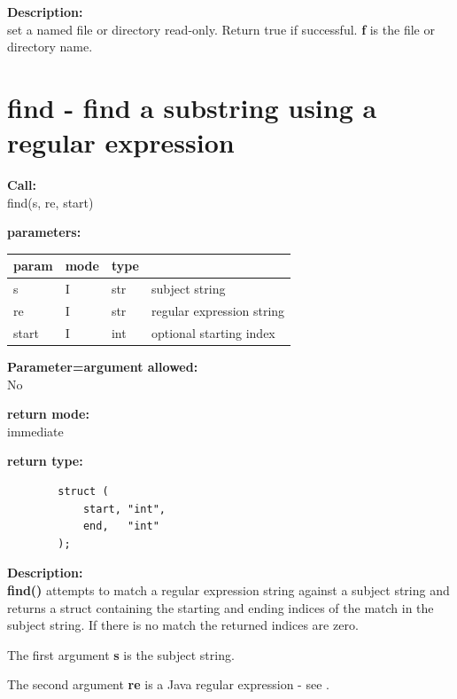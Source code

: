         {\bf Description:} \\
        set a named file or directory read-only. Return true if successful.
        {\bf f} is the file or directory name.




       

    \section{find - find a substring using a regular expression}\label{sec:iffind}
        
        {\bf Call:} \\
        find(s, re, start)
        
        {\bf parameters:} \\
        \begin{tabular}{| l | l | l | l |}
        \hline
        param  & mode & type & \\
        \hline \hline
        s     & I & str & subject string            \\ \hline
        re    & I & str & regular expression string \\ \hline
        start & I & int & optional starting index   \\ \hline
        \end{tabular}
        
        {\bf Parameter=argument allowed:} \\
        No
        
        {\bf return mode:} \\
        immediate

        {\bf return type:} \\
        \begin{verbatim}
        struct (
            start, "int",
            end,   "int"
        );
        \end{verbatim}
        
        {\bf Description:} \\
        {\bf find()} attempts to match a regular expression string against a
        subject string and returns a struct containing the starting and ending
        indices of the match in the subject string. If there is no match the
        returned indices are zero.
        
        The first argument {\bf s} is the subject string.
        
        The second argument {\bf re} is a Java regular expression - 
        see .
        
